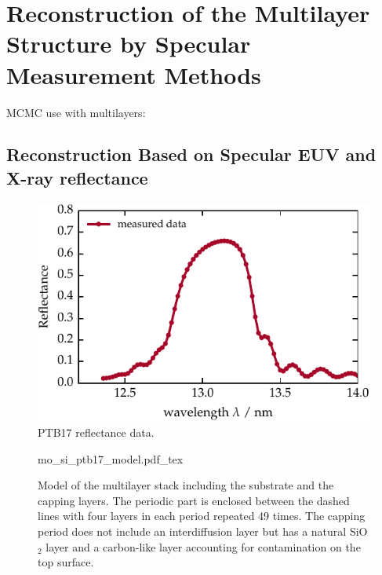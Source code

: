 \chapter{Reconstruction of the Multilayer Structure by Specular Measurement Methods} \label{ch_spec}
\cite{haase_role_2014}
MCMC use with multilayers: \cite{hobson_markov-chain_2004}


\section{Reconstruction Based on Specular EUV and X-ray reflectance}
\begin{figure}[htbp]
\centering
\includegraphics{img/PTB17_reflectance_AOI_15}
\caption{PTB17 reflectance data.}
\label{ch_spec:fig_ptb17_reflectance_AOI_15}
\end{figure}

\begin{figure}[htbp]
    \def\svgwidth{0.7\textwidth}
    \selectfont\footnotesize
    {mo_si_ptb17_model.pdf_tex}
    \caption{Model of the multilayer stack including the substrate and the capping layers. The periodic part is enclosed between the dashed lines with four layers in each period repeated 49 times. The capping period does not include an interdiffusion layer but has a natural SiO$_2$ layer and a carbon-like layer accounting for contamination on the top surface.}
    \label{fig:model}
\end{figure}

